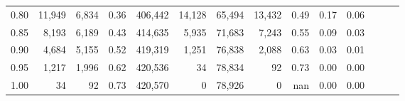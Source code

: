 \begin{tabular}{rrrrrrrrrrrrrr}
0.80 &  11,949 &  6,834 &  0.36 &  406,442 &   14,128 &  65,494 &  13,432 &  0.49 &  0.17 &      0.06 \\
0.85 &   8,193 &  6,189 &  0.43 &  414,635 &    5,935 &  71,683 &   7,243 &  0.55 &  0.09 &      0.03 \\
0.90 &   4,684 &  5,155 &  0.52 &  419,319 &    1,251 &  76,838 &   2,088 &  0.63 &  0.03 &      0.01 \\
0.95 &   1,217 &  1,996 &  0.62 &  420,536 &       34 &  78,834 &      92 &  0.73 &  0.00 &      0.00 \\
1.00 &      34 &     92 &  0.73 &  420,570 &        0 &  78,926 &       0 &   nan &  0.00 &      0.00 \\
\bottomrule
\end{tabular}
